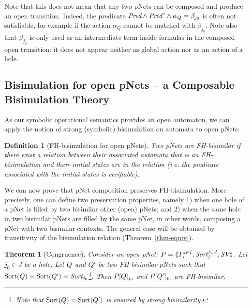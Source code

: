 \documentclass{lmcs}
\newcommand{\TODO}[1]{\textcolor{red}{\textbf{[TODO:#1]}}}
\newtheorem{theorem}{Theorem}
\newtheorem{definition}{Definition}
\begin{document}
Note that this does not mean that any two pNets can be composed and produce an open 
transition. Indeed, the predicate $\Pred\land\Pred\,'\land \alpha_Q=\beta_{j_0}$ is often not  satisfiable, for example if the action  $\alpha_Q$ cannot be matched with $\beta_{j_0}$.
Note also that $\beta_{j_0}$ is  only used as an intermediate term inside formulas in the composed open transition: it 
does not appear neither as global action nor as an action of a hole.


\subsection{Bisimulation for open pNets -- a Composable Bisimulation Theory}
\label{section:bisimulation-PN}
As  our symbolic operational semantics provides an open automaton, we can apply the notion of
	strong (symbolic) bisimulation on automata to open pNets:
\begin{definition}[FH-bisimulation for open pNets]\label{def:bisim-pnets}
Two pNets are FH-bisimilar if there exist a relation between their associated 
automata that is an FH-bisimulation and their initial states are in the relation (i.e. the predicate associated with the initial states is verifiable).
\end{definition}

We can now prove that pNet composition  preserves
FH-bisimulation. More precisely, one can define two preservation
properties, namely 1) when one hole of a pNet is filled by two bisimilar other (open) pNets; and 2) when the same hole in two bisimilar pNets are
filled by the same pNet, in other words, composing a pNet with two
bisimilar contexts. The general case will be obtained by
transitivity of the bisimulation relation (Theorem~\ref{thm-equiv}). 

\begin{theorem}[Congruence]\label{thm-congr-eq}
	Consider an open pNet:
	$\pNet = \mylangle \pNet_i^{i\in I}, \Sort_j^{j\in J}, 
	\set{\symb{SV}}\myrangle$.
	Let $j_0\in J$ be a hole. Let $Q$ and $Q'$ be two FH-bisimilar pNets such that 
	$\Sortop(\pNetQ)=\Sortop(\pNetQ')=\Sort_{j_0}$\footnote{Note that $\operatorname{Sort}(Q)=\operatorname{Sort}(Q')$ is 
	ensured by 
	strong bisimilarity.}. Then 
	$P[Q]_{j_0}$ and 
	$P[Q']_{j_0}$ are FH-bisimilar.
\end{theorem}
 
\end{document}
